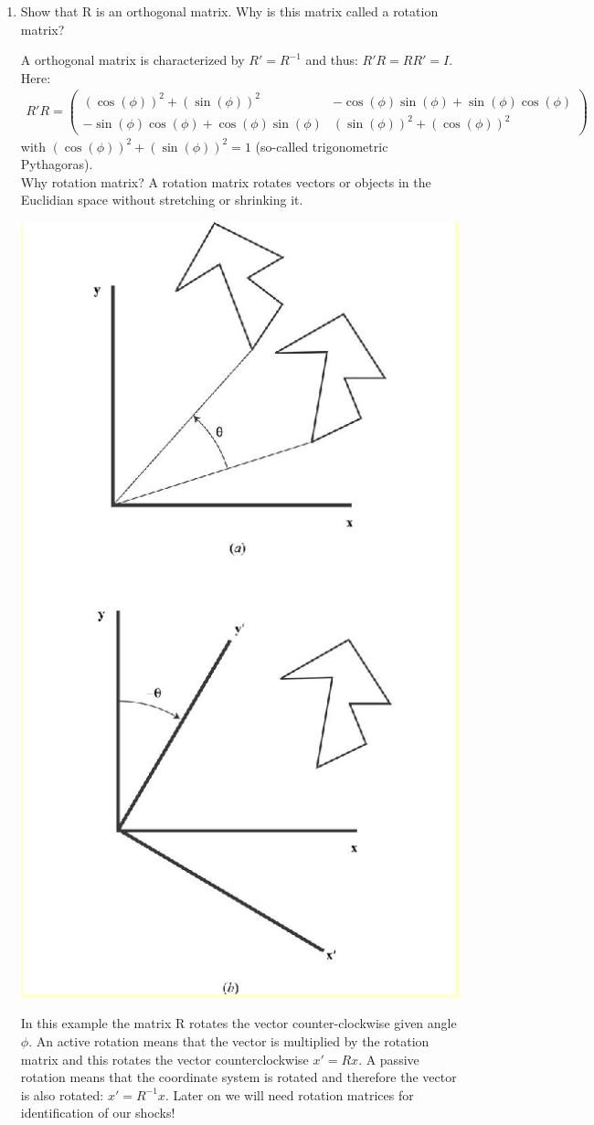 \documentclass[a4paper]{scrartcl}
\begin{document}
\begin{enumerate}
	\item Show that R is an orthogonal matrix. Why is this matrix called a rotation matrix?
	\begin{solution}
		A orthogonal matrix is characterized by $R'=R^{-1}$ and thus: $R'R=R R' = I$. Here:
		\begin{align*}
		R'R = \begin{pmatrix}
		(\cos(\phi))^2 + (\sin(\phi))^2 & -\cos(\phi)\sin(\phi) + \sin(\phi)\cos(\phi)\\-\sin(\phi)\cos(\phi) + \cos(\phi)\sin(\phi) & (\sin(\phi))^2 + (\cos(\phi))^2
		\end{pmatrix}
		\end{align*}
		with $(\cos(\phi))^2 + (\sin(\phi))^2 = 1$ (so-called trigonometric Pythagoras).\\
		Why rotation matrix? A rotation matrix rotates vectors or objects in the Euclidian space without stretching or shrinking it.
		\begin{center}  \includegraphics[width=.5\textwidth]{Rotation.png} \end{center}
		In this example the matrix R rotates the vector counter-clockwise given angle $\phi$. An active rotation means that the vector is multiplied by the rotation matrix and this rotates the vector counterclockwise $x' = Rx$. A passive rotation means that the coordinate system is rotated and therefore the vector is also rotated: $x' = R^{-1} x$. Later on we will need rotation matrices for identification of our shocks!
	

\end{solution}
\end{enumerate}
\end{document}
